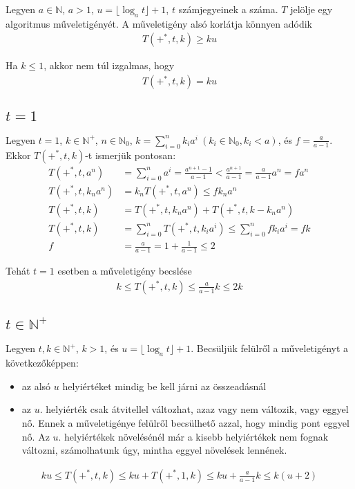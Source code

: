 \documentclass{article}
\begin{document}
Legyen $a \in \mathbb{N}$, $a>1$, $u=\lfloor \log_{a}{t} \rfloor+1$, $t$ számjegyeinek a száma. $T$ jelölje egy algoritmus műveletigényét.
A műveletigény alsó korlátja könnyen adódik
\begin{align*}
T(+^*, t, k) \ge ku
\end{align*}

Ha $k \le 1$, akkor nem túl izgalmas, hogy
\begin{align*}
T(+^*, t, k) = ku
\end{align*}

\subsection{$t=1$}

Legyen $t=1$, $k \in \mathbb{N}^+$, $n \in \mathbb{N}_0$, $k = \sum_{i=0}^{n} k_i a^i\ (k_i \in \mathbb{N}_0, k_i<a)$, és $f=\frac{a}{a-1}$.
Ekkor $T(+^*, t, k)$-t ismerjük pontosan:
\begin{align*}
T(+^*, t, a^n)
&= \sum_{i=0}^n a^i
= \frac{a^{n+1}-1}{a-1}
< \frac{a^{n+1}}{a-1}
= \frac{a}{a-1} a^n
= f a^n \\
T(+^*, t, k_n a^n)
&= k_n T(+^*, t, a^n)
\le f k_n a^n \\
T(+^*, t, k)
&= T(+^*, t, k_n a^n) + T(+^*, t, k - k_n a^n) \\
T(+^*, t, k)
&= \sum_{i=0}^{n} T(+^*, t, k_i a^i)
\le \sum_{i=0}^{n} f k_i a^i
= f k \\
f &= \frac{a}{a-1} = 1+\frac{1}{a-1} \le 2
\end{align*}

Tehát $t=1$ esetben a műveletigény becslése
\begin{align*}
k \le T(+^*, t, k) \le \frac{a}{a-1}k \le 2k
\end{align*}

\subsection{$t \in \mathbb{N}^+$}

Legyen $t, k \in \mathbb{N}^+$, $k>1$, és $u = \lfloor \log_{a}{t} \rfloor + 1$.
Becsüljük felülről a műveletigényt a következőképpen:
\begin{itemize}
\item az alsó $u$ helyiértéket mindig be kell járni az összeadásnál

\item az $u$. helyiérték csak átvitellel változhat, azaz vagy nem változik, vagy eggyel nő.
Ennek a műveletigénye felülről becsülhető azzal, hogy mindig pont eggyel nő.
Az $u$. helyiértékek növelésénél már a kisebb helyiértékek nem fognak változni, számolhatunk úgy, mintha eggyel növelések lennének.
\end{itemize}
\begin{align*}
ku \le T(+^*, t, k) \le ku+T(+^*, 1, k) \le ku+\frac{a}{a-1}k \le k(u+2)
\end{align*}
\end{document}
